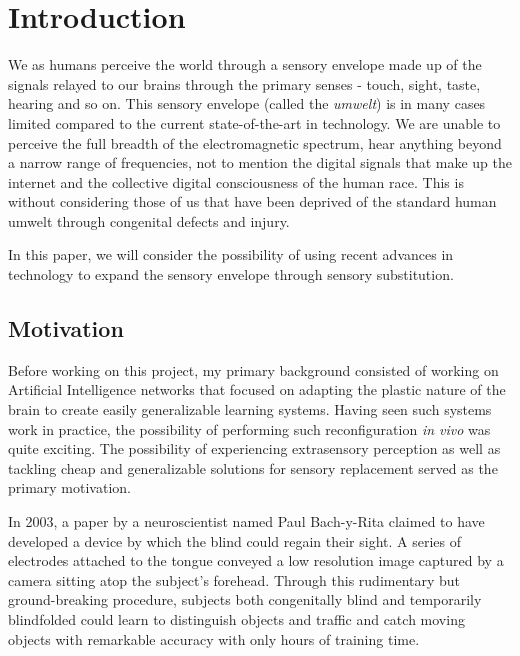 \documentclass[
12pt, %
oneside, %
english, %
doublespacing, %
headsepline, %
]{MastersDoctoralThesis} %
\begin{document}
\mainmatter %

\pagestyle{thesis} %


% 
%
%
%
%

\chapter{Introduction}
\label{Introduction}

We as humans perceive the world through a sensory envelope made up of the signals relayed to our brains through the primary senses - touch, sight, taste, hearing and so on. This sensory envelope (called the \textit{umwelt}) is in many cases limited compared to the current state-of-the-art in technology. We are unable to perceive the full breadth of the electromagnetic spectrum, hear anything beyond a narrow range of frequencies, not to mention the digital signals that make up the internet and the collective digital consciousness of the human race. This is without considering those of us that have been deprived of the standard human umwelt through congenital defects and injury.

In this paper, we will consider the possibility of using recent advances in technology to expand the sensory envelope through sensory substitution.

\section{Motivation}
Before working on this project, my primary background consisted of working on Artificial Intelligence networks \parencite{hawkins_intelligence:_2007} that focused on adapting the plastic nature of the brain to create easily generalizable learning systems. Having seen such systems work in practice, the possibility of performing such reconfiguration \emph{in vivo} was quite exciting. The possibility of experiencing extrasensory perception as well as tackling cheap and generalizable solutions for sensory replacement served as the primary motivation.

In 2003, a paper \parencite{bach-y-rita_seeing_nodate} by a neuroscientist named Paul Bach-y-Rita claimed to have developed a device by which the blind could regain their sight. A series of electrodes attached to the tongue conveyed a low resolution image captured by a camera sitting atop the subject’s forehead. Through this rudimentary but ground-breaking procedure, subjects both congenitally blind and temporarily blindfolded could learn to distinguish objects and traffic and catch moving objects with remarkable accuracy with only hours of training time.
\end{document}
